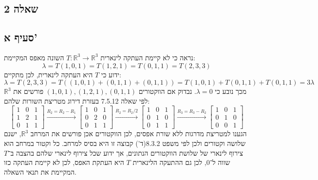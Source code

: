 \documentclass[a4paper,10pt]{article}
\begin{document}
\begin{hebrew}
	\section{שאלה 2}
	\subsection{סעיף א'}
	נראה כי לא קיימת העתקה לינארית $T : \mathbb{R}^3 \to \mathbb{R}^3$
	השונה מאפס המקיימת:
	\[
		\lambda = T(1, 0, 1) = T(1, 2, 1) = T(0, 1, 1) = T(2, 3, 3)
	\]
	ידוע כי $T$ היא העתקה לינארית, לכן מתקיים:
	\[
		\lambda
		= T(2, 3, 3)
		= T((1, 0, 1) + (0, 1, 1) + (0, 1, 1))
		= T(1, 0, 1) + T(0, 1, 1) + T(0, 1, 1)
		= 3 \lambda
	\]
	מכך נובע כי $\lambda = 0$.
	נבדוק אם הווקטורים $(1, 0, 1), (1, 2, 1), (0, 1, 1)$
	פורשים את $\mathbb{R}^3$ לפי שאלה 7.5.12 בעזרת דירוג מטריצת השורות שלהם:
	\[
		\begin{bmatrix}
			1 & 0 & 1 \\
			1 & 2 & 1 \\
			0 & 1 & 1
		\end{bmatrix}
		\xrightarrow{R_2 = R_2 - R_1}
		\begin{bmatrix}
			1 & 0 & 1 \\
			0 & 2 & 0 \\
			0 & 1 & 1
		\end{bmatrix}
		\xrightarrow{R_2 = R_2 / 2}
		\begin{bmatrix}
			1 & 0 & 1 \\
			0 & 1 & 0 \\
			0 & 1 & 1
		\end{bmatrix}
		\xrightarrow{R_3 = R_3 - R_2}
		\begin{bmatrix}
			1 & 0 & 1 \\
			0 & 1 & 0 \\
			0 & 0 & 1
		\end{bmatrix}
	\]
	הגענו למטריצת מדרגות ללא שורת אפסים, לכן הווקטורים אכן פורשים את
	המרחב $\mathbb{R}^3$, ישנם שלושה וקטורים ולכן לפי משפט 8.3.2(ד')
	קבוצה זו היא בסיס למרחב. כל וקטור במרחב הוא צירוף לינארי של שלושת 
	הווקטורים הנתונים, אך ידוע שכל צירוף לינארי שלהם בהצבה ב־$T$ שווה ל־$0$,
	לכן גם ההתעקה הלינארית $T$ היא העתקת האפס,
	לכן לא קיימת העתקה כזו המקיימת את תנאי השאלה.


\end{hebrew}
\end{document}
